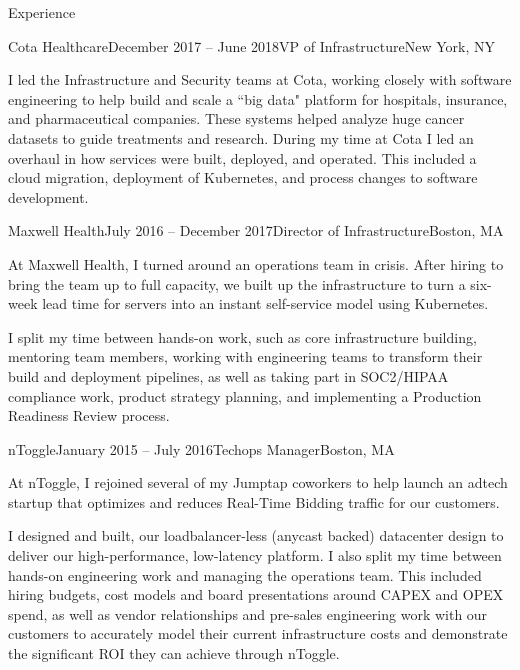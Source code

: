 \documentclass{resume} %
\begin{document}
\begin{rSection}{Experience}
\begin{rSubsection}{Cota Healthcare}{December 2017 -- June 2018}{VP of Infrastructure}{New York, NY}
\item[] I led the Infrastructure and Security teams at Cota, working closely with
  software engineering to help build and scale a ``big data" platform for hospitals,
  insurance, and pharmaceutical companies.  These systems helped analyze huge cancer
  datasets to guide treatments and research.  During my time at Cota I led an overhaul
  in how services were built, deployed, and operated.  This included a cloud migration,
  deployment of Kubernetes, and process changes to software development.
\end{rSubsection}

\begin{rSubsection}{Maxwell Health}{July 2016 -- December 2017}{Director of Infrastructure}{Boston, MA}
\item[] At Maxwell Health, I turned around an operations team in crisis.  After
  hiring to bring the team up to full capacity, we built up the infrastructure
  to turn a six-week lead time for servers into an instant self-service model
  using Kubernetes.

I split my time between hands-on work, such as core infrastructure building,
  mentoring team members, working with engineering teams to transform their
  build and deployment pipelines, as well as taking part in SOC2/HIPAA
  compliance work, product strategy planning, and implementing a Production
  Readiness Review process.
\end{rSubsection}

\begin{rSubsection}{nToggle}{January 2015 -- July 2016}{Techops Manager}{Boston, MA}

\item[] At nToggle, I rejoined several of my Jumptap coworkers to help launch
  an adtech startup that optimizes and reduces Real-Time Bidding traffic for
  our customers.

I designed and built, our loadbalancer-less (anycast backed) datacenter design
  to deliver our high-performance, low-latency platform.  I also split my time between hands-on engineering work and managing the operations
  team.  This included hiring budgets, cost models and board presentations
  around CAPEX and OPEX spend, as well as vendor relationships and pre-sales
  engineering work with our customers to accurately model their current
  infrastructure costs and demonstrate the significant ROI they can achieve
  through nToggle.


\end{rSubsection}
\end{rSection}
\end{document}
